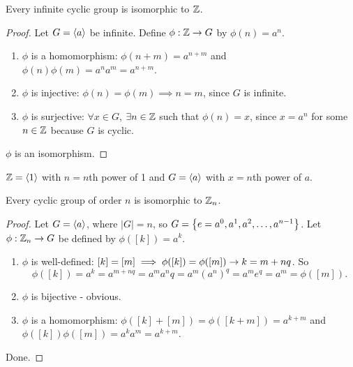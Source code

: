 \documentclass[]{article}
\begin{document}
\begin{theorem}
	Every infinite cyclic group is isomorphic to $\mathbb{Z}$.
\end{theorem}
\begin{proof}
	Let $G =\langle a \rangle$ be infinite. Define $\phi:\mathbb{Z}\rightarrow G$ by $\phi(n) = a^n$.
	\begin{enumerate}
		\item $\phi$ is a homomorphism: $\phi(n+m) = a^{n+m}$ and $\phi(n)\phi(m) = a^na^m = a^{n+m}$.
		\item $\phi$ is injective: $\phi(n) = \phi(m) \implies n = m$, since $G$ is infinite.
		\item $\phi$ is surjective: $\forall x\in G$, $\exists n\in\mathbb{Z}$ such that $\phi(n) = x$, since $x = a^n$ for some $n\in\mathbb{Z}$ because $G$ is cyclic.
	\end{enumerate}
	$\phi$ is an isomorphism.
\end{proof}
\begin{remark}
	$\mathbb{Z} =\langle 1 \rangle$ with $n = n$th power of 1 and $G =\langle a \rangle$ with $x = n$th power of $a$.
\end{remark}

\begin{theorem}
	Every cyclic group of order $n$ is isomorphic to $\mathbb{Z}_n$.
\end{theorem}
\begin{proof}
	Let $G =\langle a \rangle$, where $|G| = n$, so $G = \left\{ e=a^0,a^1,a^2,\dots,a^{n-1} \right\}$.
	Let $\phi:\mathbb{Z}_n\rightarrow G$ be defined by $\phi([k]) = a^k$.
	\begin{enumerate}
		\item $\phi$ is well-defined: $[k] = [m] \implies \phi([k]) = \phi([m]) \rightarrow k = m+nq$. 
			So $$\phi([k]) = a^k = a^{m+nq} = a^ma^nq = a^m(a^n)^q = a^me^q = a^m = \phi([m]).$$
		\item $\phi$ is bijective - obvious.
		\item $\phi$ is a homomorphism: $\phi([k]+[m]) = \phi([k+m]) = a^{k+m}$ and $\phi([k])\phi([m]) = a^ka^m = a^{k+m}$.
	\end{enumerate}
	Done.
\end{proof}
\end{document}
